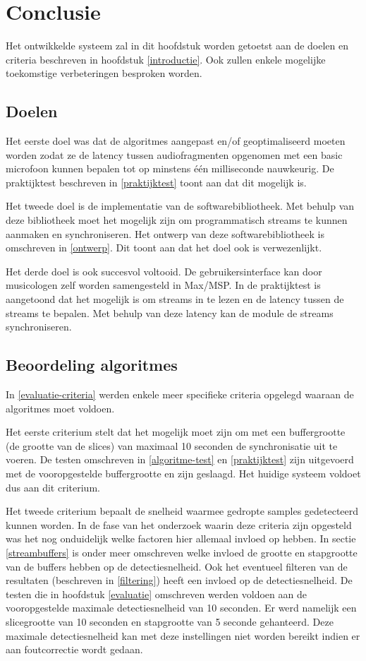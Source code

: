 \chapter{Conclusie}

Het ontwikkelde systeem zal in dit hoofdstuk worden getoetst aan de doelen en criteria beschreven in hoofdstuk \ref{introductie}. Ook zullen enkele mogelijke toekomstige verbeteringen besproken worden.

\section{Doelen}

Het eerste doel was dat de algoritmes aangepast en/of geoptimaliseerd moeten worden zodat ze de latency tussen audiofragmenten opgenomen met een basic microfoon kunnen bepalen tot op minstens één milliseconde nauwkeurig. De praktijktest beschreven in \ref{praktijktest} toont aan dat dit mogelijk is.

Het tweede doel is de implementatie van de softwarebibliotheek. Met behulp van deze bibliotheek moet het mogelijk zijn om programmatisch streams te kunnen aanmaken en synchroniseren. Het ontwerp van deze softwarebibliotheek is omschreven in \ref{ontwerp}. Dit toont aan dat het doel ook is verwezenlijkt.

Het derde doel is ook succesvol voltooid. De gebruikersinterface kan door musicologen zelf worden samengesteld in Max/MSP. In de praktijktest is aangetoond dat het mogelijk is om streams in te lezen en de latency tussen de streams te bepalen. Met behulp van deze latency kan de module de streams synchroniseren.

\section{Beoordeling algoritmes}

In \ref{evaluatie-criteria} werden enkele meer specifieke criteria opgelegd waaraan de algoritmes moet voldoen.

Het eerste criterium stelt dat het mogelijk moet zijn om met een buffergrootte (de grootte van de slices) van maximaal 10 seconden de synchronisatie uit te voeren. De testen omschreven in \ref{algoritme-test} en \ref{praktijktest} zijn uitgevoerd met de vooropgestelde buffergrootte en zijn geslaagd. Het huidige systeem voldoet dus aan dit criterium.

Het tweede criterium bepaalt de snelheid waarmee gedropte samples gedetecteerd kunnen worden. In de fase van het onderzoek waarin deze criteria zijn opgesteld was het nog onduidelijk welke factoren hier allemaal invloed op hebben. In sectie \ref{streambuffers} is onder meer omschreven welke invloed de grootte en stapgrootte van de buffers hebben op de detectiesnelheid. Ook het eventueel filteren van de resultaten (beschreven in \ref{filtering}) heeft een invloed op de detectiesnelheid. De testen die in hoofdstuk \ref{evaluatie} omschreven werden voldoen aan de vooropgestelde maximale detectiesnelheid van 10 seconden. Er werd namelijk een slicegrootte van 10 seconden en stapgrootte van 5 seconde gehanteerd. Deze maximale detectiesnelheid kan met deze instellingen niet worden bereikt indien er aan foutcorrectie wordt gedaan.

